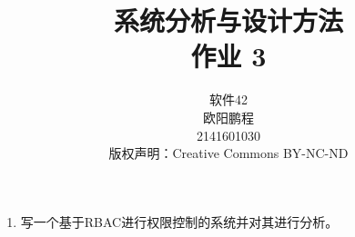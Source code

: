 \documentclass[UTF8]{ctexart}
\title{系统分析与设计方法 \\ 作业 3}
\author{软件42 \\ 欧阳鹏程 \\ 2141601030 \\ 版权声明：Creative Commons BY-NC-ND}
\begin{document}
\maketitle

\begin{enumerate}
	\item 写一个基于RBAC进行权限控制的系统并对其进行分析。
		
\end{enumerate}
\end{document}
